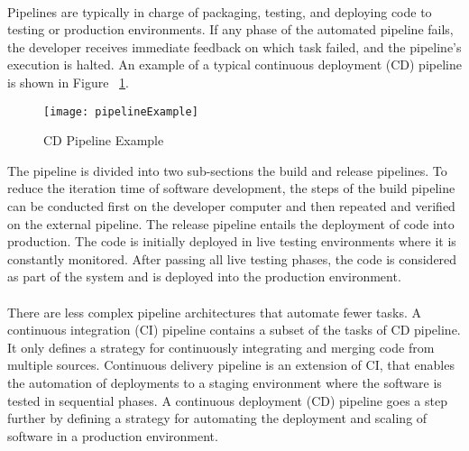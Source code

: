 \paragraph{}

Pipelines are typically in charge of packaging, testing, and deploying code to testing or production environments.
If any phase of the automated pipeline fails, the developer receives immediate feedback on which task failed, and the pipeline's execution is halted.
An example of a typical continuous deployment (CD) pipeline is shown in Figure ~\ref{fig:pipeline_example}.

\begin{figure}[htbp]
    \centering
    \texttt{[image: pipelineExample]}
    \caption{CD Pipeline Example}
    \label{fig:pipeline_example}
\end{figure}

The pipeline is divided into two sub-sections the build and release pipelines.
To reduce the iteration time of software development,
the steps of the build pipeline can be conducted first on the developer computer and then repeated and verified on the external pipeline.
The release pipeline entails the deployment of code into production.
The code is initially deployed in live testing environments where it is constantly monitored.
After passing all live testing phases, the code is considered as part of the system and is deployed into the production environment.

\paragraph{}

There are less complex pipeline architectures that automate fewer tasks.
A continuous integration (CI) pipeline contains a subset of the tasks of CD pipeline.
It only defines a strategy for continuously integrating and merging code from multiple sources.
Continuous delivery pipeline is an extension of CI, that enables the automation of deployments to a staging environment where the software is tested in sequential phases.
A continuous deployment (CD) pipeline goes a step further by defining a strategy for automating the deployment and scaling of software in a production environment.




